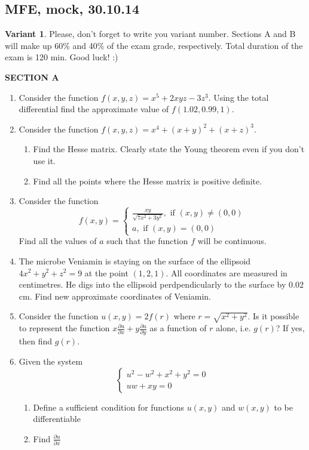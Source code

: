 \subsection{MFE, mock, 30.10.14}

\textbf{Variant 1}. Please, don't forget to write you variant number. Sections A and B will make up 60\% and 40\% of the exam grade, respectively. Total duration of the exam is 120 min. Good luck! :)

\textbf{SECTION A}

\begin{enumerate}

\item Consider the function $f(x,y,z)=x^5+2xyz-3z^3$. Using the total differential find the approximate value of $f(1.02,0.99,1)$.

\item Consider the function $f(x,y,z)=x^4+(x+y)^2+(x+z)^3$.
\begin{enumerate}
\item Find the Hesse matrix. Clearly state the Young theorem even if you don't use it.
\item Find all the points where the Hesse matrix is positive definite.
\end{enumerate}

\item Consider the function
\begin{equation} \nonumber
f(x,y)=
\begin{cases}
	\frac{xy}{\sqrt{7x^2+3y^2}}, \text{ if } (x,y)\neq (0,0) \\
	a, \text{ if } (x,y)=(0,0)
\end{cases}
\end{equation}
Find all the values of $a$ such that the function $f$ will be continuous.


\item The microbe Veniamin is staying on the surface of the ellipsoid $4x^2+y^2+z^2=9$ at the point $(1,2,1)$. All coordinates are measured in centimetres. He digs into the ellipsoid perdpendicularly to the surface by $0.02$ cm. Find new approximate coordinates of Veniamin.

\item Consider the function $u(x,y)=2f(r)$ where $r=\sqrt{x^2+y^2}$. Is it possible to represent the function $x\frac{\partial u}{\partial x}+y\frac{\partial u}{\partial y}$ as a function of $r$ alone, i.e. $g(r)$? If yes, then find $g(r)$.

\item Given the system
\begin{equation} \nonumber
\begin{cases}
u^2-w^2+x^2+y^2=0 \\
uw+xy=0
\end{cases}
\end{equation}
\begin{enumerate}
\item Define a sufficient condition for functions $u(x,y)$ and $w(x,y)$ to be differentiable
\item Find $\frac{\partial u}{\partial x}$
\end{enumerate}

\end{enumerate}

